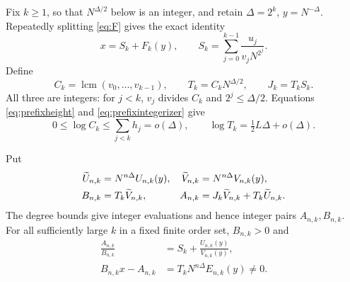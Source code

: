 \documentclass{amsart}
\numberwithin{equation}{section}
\begin{document}
Fix $k\ge1$, so that $N^{\Delta/2}$ below is an integer, and retain
$\Delta=2^k$, $y=N^{-\Delta}$.
Repeatedly splitting \eqref{eq:F} gives the exact identity
\begin{equation}\label{eq:iteration}
x=S_k+F_k(y),\qquad
S_k=\sum_{j=0}^{k-1}\frac{u_j}{v_jN^{2^j}}.
\end{equation}
Define
\begin{equation}\label{eq:prefixintegerizer}
C_k=\operatorname{lcm}(v_0,\ldots,v_{k-1}),\qquad
T_k=C_kN^{\Delta/2},\qquad J_k=T_kS_k.
\end{equation}
All three are integers: for $j<k$, $v_j$ divides $C_k$ and
$2^j\le\Delta/2$. Equations \eqref{eq:prefixheight} and
\eqref{eq:prefixintegerizer} give
\begin{equation}\label{eq:prefixcost}
0\le\log C_k\le\sum_{j<k}h_j=o(\Delta),\qquad
\log T_k=\tfrac12 L\Delta+o(\Delta).
\end{equation}

Put
\begin{align}
\widetilde U_{n,k}&=N^{n\Delta}U_{n,k}(y),&
\widetilde V_{n,k}&=N^{n\Delta}V_{n,k}(y),\label{eq:AB}\\
B_{n,k}&=T_k\widetilde V_{n,k},&
A_{n,k}&=J_k\widetilde V_{n,k}+T_k\widetilde U_{n,k}.\notag
\end{align}
The degree bounds give integer evaluations and hence integer pairs
$A_{n,k},B_{n,k}$.
For all sufficiently large $k$ in a fixed finite order set,
$B_{n,k}>0$ and
\begin{align}
\frac{A_{n,k}}{B_{n,k}}
 &=S_k+\frac{U_{n,k}(y)}{V_{n,k}(y)},\label{eq:quotient}\\
B_{n,k}x-A_{n,k}
 &=T_kN^{n\Delta}E_{n,k}(y)\ne0.\label{eq:integererror}
\end{align}
\end{document}
